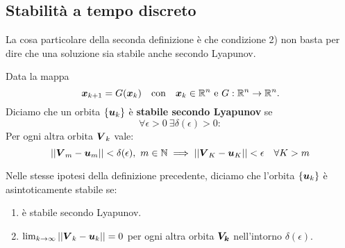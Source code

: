 \subsection{Stabilità a tempo discreto}%
\label{sub:Stabilità a tempo discreto}
La cosa particolare della seconda definizione è che condizione 2) non basta per dire che una soluzione sia stabile anche secondo Lyapunov.
\begin{defn}
    Data la mappa
    \[
	\boldsymbol{x}_{k+1}=G(\boldsymbol{x}_k) \quad \text{con} \quad  \boldsymbol{x}_k \in \mathbb{R}^n \ \text{e } G: \mathbb{R}^n\to \mathbb{R}^n.
    \] 
    Diciamo che un orbita $\left\{\boldsymbol{u}_k\right\}$ è \textbf{stabile secondo Lyapunov} se 
    \[
	\forall \epsilon > 0 \ \exists \delta (\epsilon)>0:
    \] 
    Per ogni altra orbita $\boldsymbol{V}_k$ vale:
    \[
	\left|\left|\boldsymbol{V}_m - \boldsymbol{u}_m\right|\right|< \delta (\epsilon), \ m \in \mathbb{N} \implies 
        \left|\left|\boldsymbol{V}_K - \boldsymbol{u}_K\right|\right|<\epsilon \quad \forall K > m
    \]
\end{defn}
\noindent
\begin{defn}

    Nelle stesse ipotesi della definizione precedente, diciamo che l'orbita $\left\{\boldsymbol{u}_k\right\}$ è asintoticamente stabile se:
    \begin{enumerate}
        \item è stabile secondo Lyapunov.
	\item $\lim_{k \to \infty} \left|\left|\boldsymbol{V}_k-\boldsymbol{u}_k\right|\right|=0$ per ogni altra orbita $\boldsymbol{V_k}$ nell'intorno $\delta (\epsilon)$.
    \end{enumerate}
\end{defn}
\noindent
